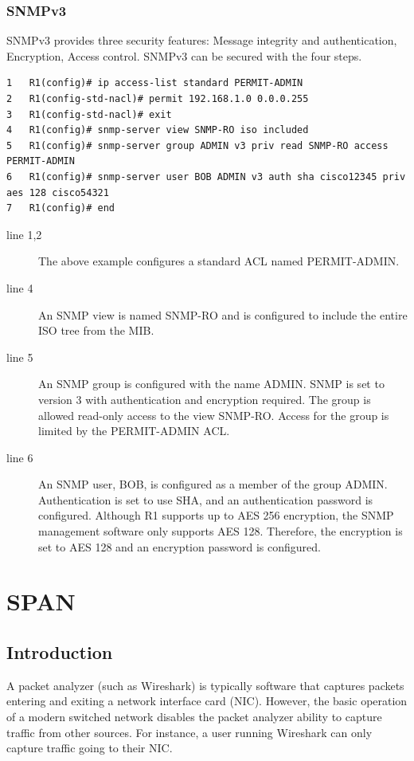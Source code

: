 \subsubsection{SNMPv3}

SNMPv3 provides three security features: Message integrity and authentication, Encryption, Access control. SNMPv3 can be secured with the four steps.

\begin{verbatim}
1	R1(config)# ip access-list standard PERMIT-ADMIN
2	R1(config-std-nacl)# permit 192.168.1.0 0.0.0.255
3	R1(config-std-nacl)# exit
4	R1(config)# snmp-server view SNMP-RO iso included
5	R1(config)# snmp-server group ADMIN v3 priv read SNMP-RO access PERMIT-ADMIN
6	R1(config)# snmp-server user BOB ADMIN v3 auth sha cisco12345 priv aes 128 cisco54321
7	R1(config)# end
\end{verbatim}

\begin{description}
\item[line 1,2] The above example configures a standard ACL named PERMIT-ADMIN. 
\item[line 4] An SNMP view is named SNMP-RO and is configured to include the entire ISO tree from the MIB. 
\item[line 5] An SNMP group is configured with the name ADMIN. SNMP is set to version 3 with authentication and encryption required. The group is allowed read-only access to the view SNMP-RO. Access for the group is limited by the PERMIT-ADMIN ACL. 
\item[line 6] An SNMP user, BOB, is configured as a member of the group ADMIN. Authentication is set to use SHA, and an authentication password is configured. Although R1 supports up to AES 256 encryption, the SNMP management software only supports AES 128. Therefore, the encryption is set to AES 128 and an encryption password is configured.
\end{description}

\section{SPAN}

\subsection{Introduction}
A packet analyzer (such as Wireshark) is typically software that captures packets entering and exiting a network interface card (NIC). However, the basic operation of a modern switched network disables the packet analyzer ability to capture traffic from other sources. For instance, a user running Wireshark can only capture traffic going to their NIC.\\

